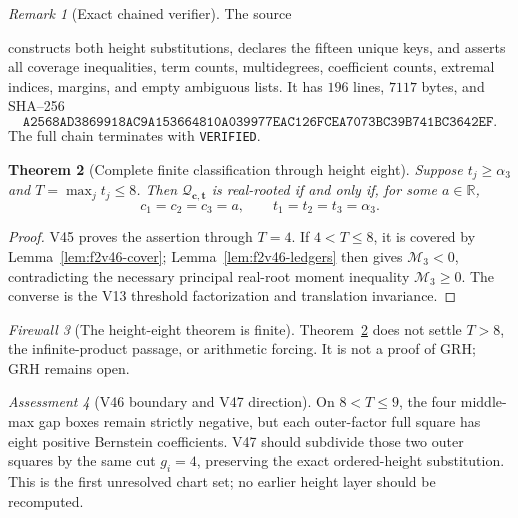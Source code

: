 \documentclass[11pt]{article}
\newtheorem{theorem}{Theorem}[section]
\theoremstyle{definition}
\theoremstyle{remark}
\newtheorem{remark}[theorem]{Remark}
\newtheorem{assessment}[theorem]{Assessment}
\newtheorem{firewall}[theorem]{Firewall}
\begin{document}
\begin{remark}[Exact chained verifier]
\label{rem:f2v46-verifier}
The source
\begin{center}
\end{center}
constructs both height substitutions, declares the fifteen unique keys,
and asserts all coverage inequalities, term counts, multidegrees,
coefficient counts, extremal indices, margins, and empty ambiguous
lists.  It has \(196\) lines, \(7117\) bytes, and SHA--256
\[
 \texttt{A2568AD3869918AC9A153664810A0399}
 \allowbreak\texttt{77EAC126FCEA7073BC39B741BC3642EF}.
\tag{N46.8}
\]
The full chain terminates with \texttt{VERIFIED}.
\end{remark}

\begin{theorem}[Complete finite classification through height eight]
\label{thm:f2v46-through-eight}
Suppose \(t_j\geq\alpha_3\) and \(T=\max_jt_j\leq8\).  Then
\(\mathcal Q_{\bm c,\bm t}\) is real-rooted if and only if, for some
\(a\in\mathbb R\),
\[
 c_1=c_2=c_3=a,\qquad t_1=t_2=t_3=\alpha_3.
\tag{N46.9}
\]
\end{theorem}

\begin{proof}
V45 proves the assertion through \(T=4\).  If \(4<T\leq8\), it is
covered by Lemma~\ref{lem:f2v46-cover}; Lemma~\ref{lem:f2v46-ledgers}
then gives \(\mathcal M_3<0\), contradicting the necessary principal
real-root moment inequality \(\mathcal M_3\geq0\).  The converse is the
V13 threshold factorization and translation invariance.
\end{proof}

\begin{firewall}[The height-eight theorem is finite]
\label{fire:f2v46}
Theorem~\ref{thm:f2v46-through-eight} does not settle \(T>8\), the
infinite-product passage, or arithmetic forcing.  It is not a proof of
GRH; GRH remains open.
\end{firewall}

\begin{assessment}[V46 boundary and V47 direction]
\label{ass:f2v46}
On \(8<T\leq9\), the four middle-max gap boxes remain strictly negative,
but each outer-factor full square has eight positive Bernstein
coefficients.  V47 should subdivide those two outer squares by the same
cut \(g_i=4\), preserving the exact ordered-height substitution.  This
is the first unresolved chart set; no earlier height layer should be
recomputed.
\end{assessment}
\end{document}
